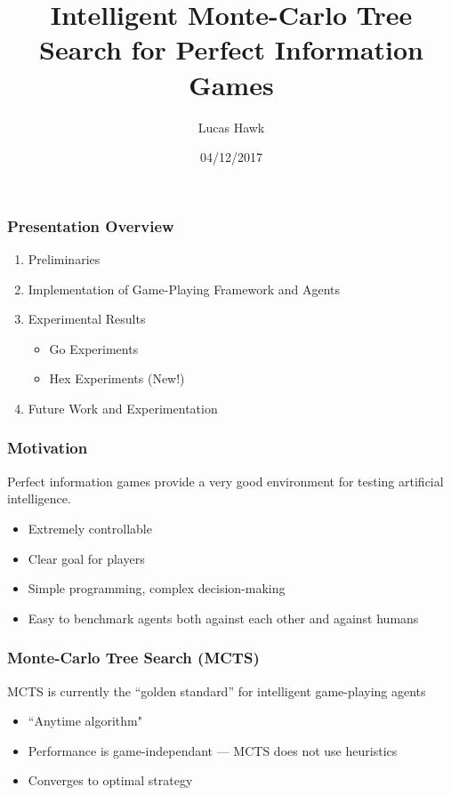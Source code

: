 \documentclass{beamer}
\title{Intelligent Monte-Carlo Tree Search for Perfect Information Games}
\author{Lucas Hawk}
\date{04/12/2017}
\begin{document}
\begin{frame}
  \titlepage
\end{frame}


\begin{frame}
\frametitle{Presentation Overview}
\begin{enumerate}
\item Preliminaries
\item Implementation of Game-Playing Framework and Agents
\item Experimental Results
\begin{itemize}
\item Go Experiments
\item Hex Experiments (New!)
\end{itemize}
\item Future Work and Experimentation
\end{enumerate}
\end{frame}

\begin{frame}
\frametitle{Motivation}
 Perfect information games provide a very good environment for testing artificial intelligence.
\begin{itemize}
 \item Extremely controllable
 \item Clear goal for players
 \item Simple programming, complex decision-making
 \item Easy to benchmark agents both against each other and against humans
\end{itemize}
\end{frame}

\begin{frame}
\frametitle{Monte-Carlo Tree Search (MCTS)}
MCTS is currently the “golden standard” for intelligent
game-playing agents
\begin{itemize}
 \item ``Anytime algorithm"
 \item Performance is game-independant --- MCTS does not use heuristics
 \item Converges to optimal strategy
\end{itemize}
\end{frame}
\end{document}
